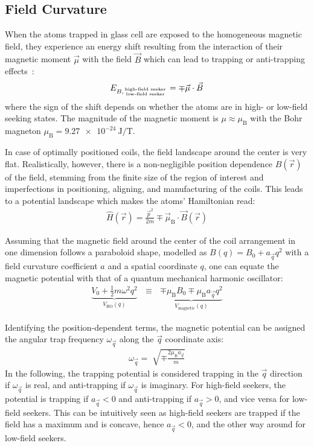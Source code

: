 \subsection*{Field Curvature}\label{ch:field_curvature_definition}
When the atoms trapped in glass cell are exposed to the homogeneous magnetic field, they experience an energy shift resulting from the interaction of their magnetic moment $\vec \mu$ with the field $\vec B$ which can lead to trapping or anti-trapping effects~\cite{pritchard_cooling_1983,gehm_properties_2003, hagemann_setup_2020}:
\begin{align}
    E_{B, {\text{high-field seeker} \atop \text{low-field seeker}}} = \mp \vec \mu \cdot \vec B
\end{align}
where the sign of the shift depends on whether the atoms are in high- or low-field seeking states. The magnitude of the magnetic moment is $\mu \approx \mu_\text{B}$ with the Bohr magneton $\mu_\text{B} = \SI{9.27e-24}{\joule\per\tesla}$.

In case of optimally positioned coils, the field landscape around the center is very flat. Realistically, however, there is a non-negligible position dependence $B(\vec r)$ of the field, stemming from the finite size of the region of interest and imperfections in positioning, aligning, and manufacturing of the coils. This leads to a potential landscape which makes the atoms' Hamiltonian read:
\begin{align}
    \hat H(\vec r) = \frac{\vec p^2}{2m} \mp \vec \mu_\text{B} \cdot \vec B(\vec r)
\end{align}

Assuming that the magnetic field around the center of the coil arrangement in one dimension follows a paraboloid shape, modelled as $B(q) = B_0 + a_{\vec q} q^2$ with a field curvature coefficient $a$ and a spatial coordinate $q$, one can equate the magnetic potential with that of a quantum mechanical harmonic oscillator:
\begin{align}
    \underbrace{V_0 + \frac{1}{2}m\omega^2q^2}_{V_\text{HO}(q)} ~~~\equiv~~~ \underbrace{\mp \mu_\text{B} B_0 \mp \mu_\text{B} a_{\vec q} q^2}_{V_\text{magnetic}(q)}
\end{align}

Identifying the position-dependent terms, the magnetic potential can be assigned the angular trap frequency $\omega_{\vec q}$ along the $\vec q$ coordinate axis:
\begin{align}\label{eq:trap_omega_definition}
    \omega_{\vec q} = \sqrt[]{\mp\frac{2 \mu_\text{B} a_{\vec q}}{m}}
\end{align}
In the following, the trapping potential is considered trapping in the ${\vec q}$ direction if $\omega_{\vec q}$ is real, and anti-trapping if $\omega_{\vec q}$ is imaginary. For high-field seekers, the potential is trapping if $a_{\vec q} < 0$ and anti-trapping if $a_{\vec q} > 0$, and vice versa for low-field seekers. This can be intuitively seen as high-field seekers are trapped if the field has a maximum and is concave, hence $a_{\vec q} < 0$, and the other way around for low-field seekers.

